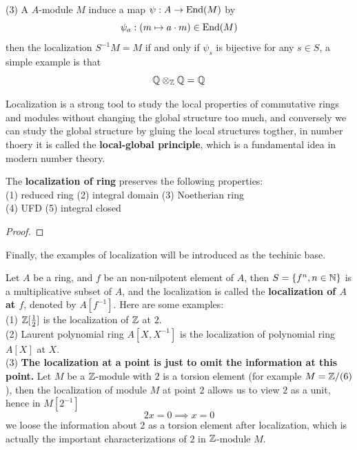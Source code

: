     (3) A \(A\)-module \(M\) induce a map \(\psi:A \to \operatorname{End}(M)\) by 
    \[\psi_a: (m \mapsto a\cdot m) \in \operatorname{End}(M)\]
    then the localization \(S^{-1}M = M \) if and only if \(\psi_s\) is bijective for any \(s \in S\), a simple example is that
    \[\mathbb{Q} \otimes_{\mathbb{Z}} \mathbb{Q} = \mathbb{Q}\]

    Localization is a strong tool to study the local properties of commutative rings and modules without changing the global structure too much, and conversely we can study the global structure by gluing the local structures togther, in number thoery it is called the \textbf{local-global principle}, which is a fundamental idea in modern number theory.

    \begin{proposition}
        The \textbf{localization of ring} preserves the following properties:\\
        (1) reduced ring \qquad (2) integral domain \qquad  (3) Noetherian ring\\ (4) UFD \qquad (5) integral closed
    \end{proposition}
    \begin{proof}
        
    \end{proof}

    Finally, the examples of localization will be introduced as the techinic base.

    \begin{example}
        Let \(A\) be a ring, and \(f\) be an non-nilpotent element of \(A\), then \(S = \{f^n, n \in \mathbb{N}\}\) is a multiplicative subset of \(A\), and the localization is called the \textbf{localization of \(A\) at \(f\)}, denoted by \(A[f^{-1}]\). Here are some examples:\\

        (1) \(\mathbb{Z}[\frac{1}{2}]\) is the localization of \(\mathbb{Z}\) at \(2\).\\

        (2) Laurent polynomial ring \(A[X,X^{-1}]\) is the localization of polynomial ring \(A[X]\) at \(X\).\\

        (3) \textbf{The localization at a point is just to omit the information at this point.} Let \(M\) be a \(\mathbb{Z}\)-module with \(2\) is a torsion element (for example \(M = \mathbb{Z}/(6)\)), then the localization of module \(M\) at point \(2\) allows us to view \(2\) as a unit, hence in \(M[2^{-1}]\)
        \[2x = 0 \implies x=0\]
        we loose the information about \(2\) as a torsion element after localization, which is actually the important characterizations of \(2\) in \(\mathbb{Z}\)-module \(M\).
    \end{example}


